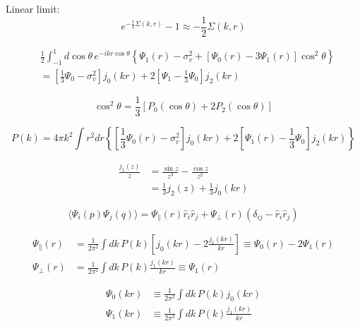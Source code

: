\documentclass[a4paper,11pt]{article}
\begin{document}
Linear limit:
\begin{equation}
  e^{-\frac{1}{2} \Sigma(k, r)} - 1 \approx -\frac{1}{2} \Sigma(k, r)
\end{equation}

\begin{equation}
  \begin{split}
  &\frac{1}{2} \int_{-1}^1 \! d\cos\theta \, e^{-ikr \cos\theta}
  \left\{
  \Psi_1(r) - \sigma_v^2 + \left[ \Psi_0(r) - 3 \Psi_1(r) \right] \cos^2 \theta
  \right\}\\
  &= \left[ \frac{1}{3}\Psi_0 - \sigma_v^2 \right] j_0(kr)
     + 2\left[ \Psi_1 - \frac{1}{3}\Psi_0 \right] j_2(kr)
  \end{split}
\end{equation}


\begin{equation}
  \cos^2 \theta = \frac{1}{3}\left[ P_0(\cos\theta) + 2 P_2(\cos\theta) \right]
\end{equation}
  
  
\begin{equation}
  P(k) = 4\pi k^2 \int r^2 dr \left\{
  \left[\frac{1}{3} \Psi_0(r) - \sigma_v^2 \right] j_0(kr)
  + 2 \left[ \Psi_1(r) - \frac{1}{3} \Psi_0 \right] j_2(kr)
  \right\}
\end{equation}

\begin{equation}
  \begin{split}
    \frac{j_1(z)}{z} &= \frac{\sin z}{z^3} - \frac{\cos z}{z^2} \\
    &= \frac{1}{3} j_2(z) + \frac{1}{3} j_0(kr)
  \end{split}
\end{equation}

\begin{equation}
  \langle \Psi_i(p) \Psi_j(q) \rangle
  = \Psi_\parallel(r) \hat{r}_i \hat{r}_j
  + \Psi_\perp(r) (\delta_{ij} - \hat{r}_i \hat{r}_j)
\end{equation}

\begin{align}
  \Psi_\parallel(r) &= \frac{1}{2\pi^2} \int \! dk \, P(k)
  \left[j_0(kr) - 2 \frac{j_1(kr)}{kr} \right] \equiv \Psi_0(r) - 2 \Psi_1(r)\\
  \Psi_\perp(r) &= \frac{1}{2\pi^2} \int \! dk \, P(k)
  \frac{j_1(kr)}{kr} \equiv \Psi_1(r)
\end{align}

\begin{align}
  \Psi_0(kr) &\equiv \frac{1}{2\pi^2} \int \! dk \, P(k) j_0(kr) \\
  \Psi_1(kr) &\equiv \frac{1}{2\pi^2} \int \! dk \, P(k) \frac{j_1(kr)}{kr}
\end{align}
\end{document}
